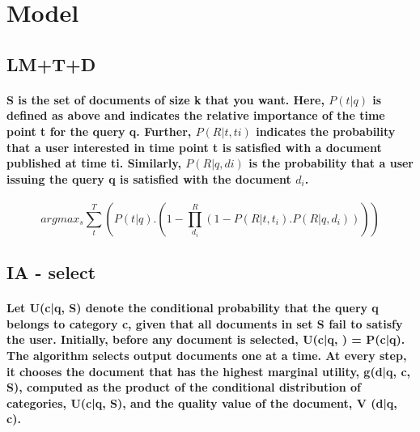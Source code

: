 \section{Model}

\subsection{LM+T+D}


\paragraph{
	S is the set of documents of size k that you want. 
	Here, $P(t|q)$ is defined as above and indicates the relative
	importance of the time point t for the query q. Further,
	$P(R|t, ti)$ indicates the probability that a user interested in
	time point t is satisfied with a document published at time
	ti. Similarly, $P(R|q, di)$ is the probability that a user issuing
	the query q is satisfied with the document $d_i$.
}

\begin{equation}
arg max_{s} \sum_{t}^{T}\left ( P(t | q).(1-\prod_{d_{i}}^{R} (1-P(R|t,t_{i}).P(R|q,d_{i}))) \right )
\end{equation}

\subsection{IA - select}

\paragraph{
	Let U(c|q, S) denote the conditional probability that the
	query q belongs to category c, given that all documents in
	set S fail to satisfy the user. Initially, before any document
	is selected, U(c|q, ) = P(c|q). The algorithm selects output
	documents one at a time. At every step, it chooses the
	document that has the highest marginal utility, g(d|q, c, S),
	computed as the product of the conditional distribution of
	categories, U(c|q, S), and the quality value of the document,
	V (d|q, c).
}


